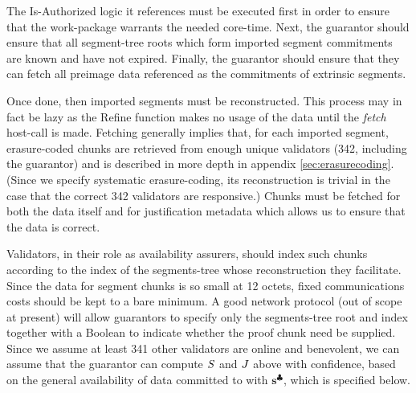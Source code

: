 The Is-Authorized logic it references must be executed first in order to ensure that the work-package warrants the needed core-time. Next, the guarantor should ensure that all segment-tree roots which form imported segment commitments are known and have not expired. Finally, the guarantor should ensure that they can fetch all preimage data referenced as the commitments of extrinsic segments.

Once done, then imported segments must be reconstructed. This process may in fact be lazy as the Refine function makes no usage of the data until the \emph{fetch} host-call is made. Fetching generally implies that, for each imported segment, erasure-coded chunks are retrieved from enough unique validators (342, including the guarantor) and is described in more depth in appendix \ref{sec:erasurecoding}. (Since we specify systematic erasure-coding, its reconstruction is trivial in the case that the correct 342 validators are responsive.) Chunks must be fetched for both the data itself and for justification metadata which allows us to ensure that the data is correct.

Validators, in their role as availability assurers, should index such chunks according to the index of the segments-tree whose reconstruction they facilitate. Since the data for segment chunks is so small at 12 octets, fixed communications costs should be kept to a bare minimum. A good network protocol (out of scope at present) will allow guarantors to specify only the segments-tree root and index together with a Boolean to indicate whether the proof chunk need be supplied. Since we assume at least 341 other validators are online and benevolent, we can assume that the guarantor can compute $S$ and $J$ above with confidence, based on the general availability of data committed to with $\mathbf{s}^\clubsuit$, which is specified below.


